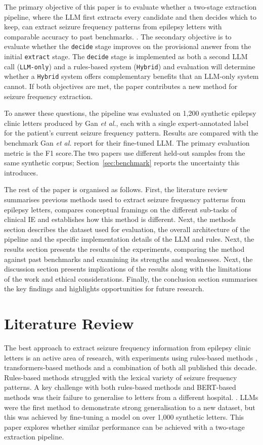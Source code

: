 \documentclass[conference]{IEEEtran}
\begin{document}
The primary objective of this paper is to evaluate whether 
a two-stage extraction pipeline, where the LLM first extracts
every candidate and then decides which to keep, can
extract seizure frequency patterns from epilepsy letters 
with comparable accuracy to past benchmarks. \cite{b3}. The secondary 
objective is to evaluate whether the \texttt{decide} stage improves 
on the provisional answer from the initial \texttt{extract} stage. 
The \texttt{decide} stage is implemented as both a second
LLM call (\texttt{LLM-only}) and a rules-based 
system (\texttt{Hybrid}) and evaluation will determine whether a \texttt{Hybrid} system offers
complementary benefits that an LLM-only system cannot.  
If both objectives are met, the paper contributes 
a new method for seizure frequency extraction.

To answer these questions, the pipeline was evaluated on 
1,200 synthetic epilepsy clinic letters produced by Gan 
\emph{et al.}\cite{b3}, each with a single expert-annotated 
label for the patient's current seizure frequency pattern. 
Results are compared with the benchmark Gan \emph{et al.} 
report for their fine-tuned LLM. The primary evaluation metric
is the F1 score.The two papers use different held-out samples 
from the same synthetic corpus; Section~\ref{sec:benchmark} 
reports the uncertainty this introduces.

The rest of the paper is organised as follows. First, the
literature review summarises previous methods used to extract
seizure frequency patterns from epilepsy letters, compares
conceptual framings on the different sub-tasks of clinical IE
and establishes how this method is different. Next, the methods
section describes the dataset used for evaluation, the overall
architecture of the pipeline and the specific implementation
details of the LLM and rules. Next, the results section
presents the results of the experiments, comparing the method
against past benchmarks and examining its strengths and
weaknesses.
Next, the discussion section presents implications of the results
along with the limitations of the work and ethical considerations. 
Finally, the conclusion section summarises the key
findings and highlights opportunities for future research.

\section{Literature Review}

The best approach to extract seizure frequency 
information from epilepsy clinic letters is an active area 
of research, with experiments using rules-based methods \cite{b4, b6}, 
transformers-based methods \cite{b3, b5, b7, b8} and a 
combination of both \cite{b9, b10} all published this decade. 
Rules-based methods struggled with the 
lexical variety of seizure frequency patterns. A key 
challenge with both rules-based methods and BERT-based 
methods was their failure to generalise to letters from a 
different hospital. \cite{b6, b10}. LLMs were the first method
to demonstrate strong generalisation to a new dataset\cite{b3},
but this was achieved by fine-tuning a model on over 1,000
synthetic letters. This paper explores whether similar
performance can be achieved with a two-stage extraction 
pipeline.
\end{document}
